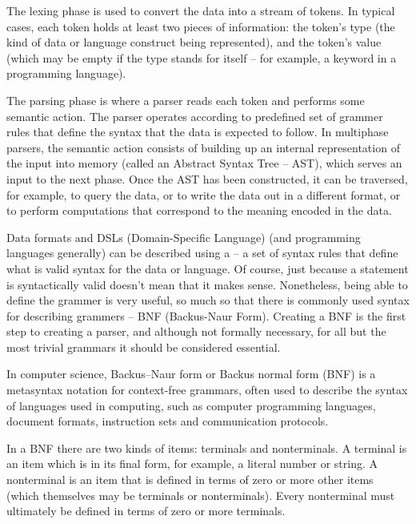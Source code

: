 The lexing phase is used to convert the data into a stream of tokens.
In typical cases, each token holds at least two pieces of information:
the token's type (the kind of data or language construct being represented), and
the token's value (which may be empty if the type stands for itself -- for example, a keyword in a programming language).



The parsing phase is where a parser reads each token and performs some semantic action.
The parser operates according to predefined set of grammer rules that define the syntax that the data is expected to follow.
In multiphase parsers, the semantic action consists of building up an internal representation of the input into memory (called an Abstract Syntax Tree -- AST), which serves an input to the next phase.
Once the AST has been constructed, it can be traversed, for example, to query the data, or to write the data out in a different format, or to perform computations that correspond to the meaning encoded in the data.



Data formats and DSLs (Domain-Specific Language) (and programming languages generally) can be described using a  -- a set of syntax rules that define what is valid syntax for the data or language.
Of course, just because a statement is syntactically valid doesn't mean that it makes sense.
Nonetheless, being able to define the grammer is very useful, so much so that there is commonly used syntax for describing grammers -- BNF (Backus-Naur Form).
Creating a BNF is the first step to creating a parser, and although not formally necessary, for all but the most trivial grammars it should be considered essential.


\begin{tcolorbox}
In computer science, Backus–Naur form or Backus normal form (BNF) is a metasyntax notation for context-free grammars, often used to describe the syntax of languages used in computing, such as computer programming languages, document formats, instruction sets and communication protocols.   
\end{tcolorbox}




In a BNF there are two kinds of items: terminals and nonterminals.
A terminal is an item which is in its final form, for example, a literal number or string.
A nonterminal is an item that is defined in terms of zero or more other items (which themselves may be terminals or nonterminals).
Every nonterminal must ultimately be defined in terms of zero or more terminals.

